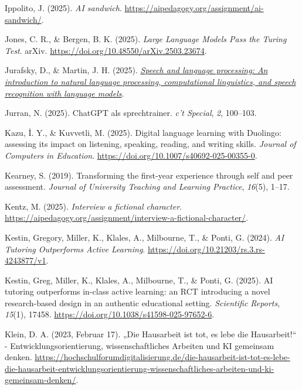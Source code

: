\documentclass[
  ngerman,
  letterpaper,
  DIV=11]{scrreprt}
\newlength{\cslhangindent}
\newenvironment{CSLReferences}[2] %
 {\begin{list}{}{%
  \setlength{\itemindent}{0pt}
  \setlength{\leftmargin}{0pt}
  \setlength{\parsep}{0pt}
  \ifodd #1
   \setlength{\leftmargin}{\cslhangindent}
   \setlength{\itemindent}{-1\cslhangindent}
  \fi
  \setlength{\itemsep}{#2\baselineskip}}}
 {\end{list}}
\begin{document}
\begin{CSLReferences}{1}{0}
Ippolito, J. (2025). \emph{AI sandwich}.
\url{https://aipedagogy.org/assignment/ai-sandwich/}.

Jones, C. R., \& Bergen, B. K. (2025). \emph{Large Language Models Pass
the Turing Test}. arXiv.
\url{https://doi.org/10.48550/arXiv.2503.23674}.

Jurafsky, D., \& Martin, J. H. (2025).
\emph{\href{https://web.stanford.edu/~jurafsky/slp3/}{Speech and
language processing: An introduction to natural language processing,
computational linguistics, and speech recognition with language
models}}.

Jurran, N. (2025). ChatGPT als sprechtrainer. \emph{c't Special},
\emph{2}, 100--103.

Kazu, İ. Y., \& Kuvvetli, M. (2025). Digital language learning with
Duolingo: assessing its impact on listening, speaking, reading, and
writing skills. \emph{Journal of Computers in Education}.
\url{https://doi.org/10.1007/s40692-025-00355-0}.

Kearney, S. (2019). Transforming the first-year experience through self
and peer assessment. \emph{Journal of University Teaching and Learning
Practice}, \emph{16}(5), 1--17.

Kentz, M. (2025). \emph{Interview a fictional character}.
\url{https://aipedagogy.org/assignment/interview-a-fictional-character/}.

Kestin, Gregory, Miller, K., Klales, A., Milbourne, T., \& Ponti, G.
(2024). \emph{AI Tutoring Outperforms Active Learning}.
\url{https://doi.org/10.21203/rs.3.rs-4243877/v1}.

Kestin, Greg, Miller, K., Klales, A., Milbourne, T., \& Ponti, G.
(2025). AI tutoring outperforms in-class active learning: an RCT
introducing a novel research-based design in an authentic educational
setting. \emph{Scientific Reports}, \emph{15}(1), 17458.
\url{https://doi.org/10.1038/s41598-025-97652-6}.

Klein, D. A. (2023, Februar 17). „Die Hausarbeit ist tot, es lebe die
Hausarbeit!{}`` - Entwicklungsorientierung, wissenschaftliches Arbeiten
und KI gemeinsam denken.
\url{https://hochschulforumdigitalisierung.de/die-hausarbeit-ist-tot-es-lebe-die-hausarbeit-entwicklungsorientierung-wissenschaftliches-arbeiten-und-ki-gemeinsam-denken/}.


\end{CSLReferences}
\end{document}

